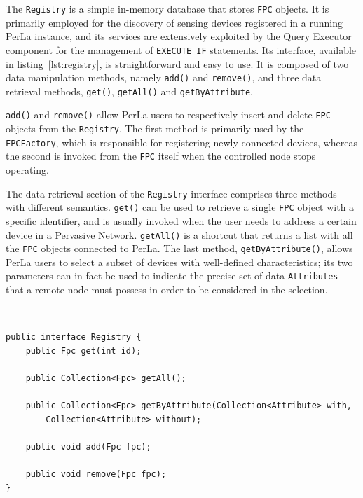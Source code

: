The \texttt{Registry} is a simple in-memory database that stores \texttt{FPC}
objects. It is primarily employed for the discovery of sensing devices
registered in a running PerLa instance, and its services are extensively
exploited by the Query Executor component for the management of \texttt{EXECUTE
IF} statements. Its interface, available in listing~\ref{lst:registry}, is
straightforward and easy to use. It is composed of two data manipulation
methods, namely \texttt{add()} and \texttt{remove()}, and three data retrieval
methods, \texttt{get()}, \texttt{getAll()} and \texttt{getByAttribute}.

\texttt{add()} and \texttt{remove()} allow PerLa users to respectively insert
and delete \texttt{FPC} objects from the \texttt{Registry}. The first method is
primarily used by the \texttt{FPCFactory}, which is responsible for registering
newly connected devices, whereas the second is invoked from the \texttt{FPC}
itself when the controlled node stops operating.

The data retrieval section of the \texttt{Registry} interface comprises three
methods with different semantics. \texttt{get()} can be used to retrieve a
single \texttt{FPC} object with a specific identifier, and is usually invoked
when the user needs to address a certain device in a Pervasive Network.
\texttt{getAll()} is a shortcut that returns a list with all the \texttt{FPC}
objects connected to PerLa. The last method, \texttt{getByAttribute()}, allows
PerLa users to select a subset of devices with well-defined characteristics;
its two parameters can in fact be used to indicate the precise set of data
\texttt{Attributes} that a remote node must possess in order to be considered
in the selection.

~\\
\lstset{language=java}
\begin{lstlisting}[caption={The Registry interface},label={lst:registry}]
public interface Registry {
    public Fpc get(int id);
    
    public Collection<Fpc> getAll();

    public Collection<Fpc> getByAttribute(Collection<Attribute> with,
        Collection<Attribute> without);
    
    public void add(Fpc fpc);
    
    public void remove(Fpc fpc);
}
\end{lstlisting}


